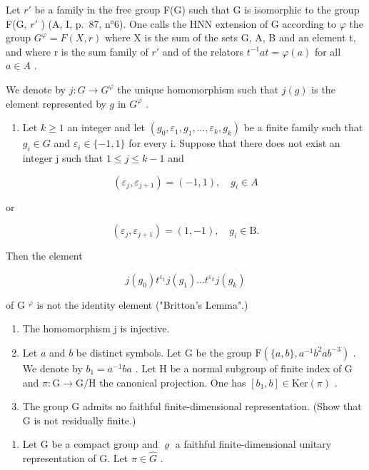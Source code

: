 Let \(r'\) be a family in the free group F(G) such that G is isomorphic to the group F(G, \(r'\) ) (A, I, p.~87, n°6). One calls the HNN extension of G according to \(\varphi\) the group \(G^{\varphi} = F(X, r)\) where X is the sum of the sets G, A, B and an element t, and where r is the sum family of \(r'\) and of the relators \(t^{-1}at = \varphi(a)\) for all \(a \in A\) .

We denote by \(j\colon G\to G^{\varphi}\) the unique homomorphism such that \(j(g)\) is the element represented by \(g\) in \(G^{\varphi}\) .

\begin{enumerate}
\def\labelenumi{\alph{enumi})}
\tightlist
\item
  Let \(k \geqslant 1\) an integer and let \((g_{0}, \varepsilon_{1}, g_{1}, \ldots, \varepsilon_{k}, g_{k})\) be a finite family such that \(g_{i} \in G\) and \(\varepsilon_{i} \in \{-1, 1\}\) for every i. Suppose that there does not exist an integer j such that \(1 \leqslant j \leqslant k - 1\) and
\end{enumerate}

\[
(\varepsilon_ {j}, \varepsilon_ {j + 1}) = (- 1, 1), \quad g _ {i} \in A
\]

or

\[
(\varepsilon_ {j}, \varepsilon_ {j + 1}) = (1, - 1), \quad g _ {i} \in \mathrm{B}.
\]

Then the element

\[
j (g _ {0}) t ^ {\varepsilon_ {1}} j (g _ {1}) \dots t ^ {\varepsilon_ {k}} j (g _ {k})
\]

of G \(^{φ}\) is not the identity element ("Britton's Lemma".)

\begin{enumerate}
\def\labelenumi{\alph{enumi})}
\setcounter{enumi}{1}
\item
  The homomorphism j is injective.
\item
  Let \(a\) and \(b\) be distinct symbols. Let G be the group \(\mathrm{F}(\{a,b\}, a^{-1}b^{2}ab^{-3})\) . We denote by \(b_{1} = a^{-1}ba\) . Let H be a normal subgroup of finite index of G and \(\pi: \mathrm{G} \to \mathrm{G}/\mathrm{H}\) the canonical projection. One has \([b_{1}, b] \in \mathrm{Ker}(\pi)\) .
\item
  The group G admits no faithful finite-dimensional representation. (Show that G is not residually finite.)
\end{enumerate}

\begin{enumerate}
\def\labelenumi{\arabic{enumi})}
\setcounter{enumi}{4}
\tightlist
\item
  Let G be a compact group and \(\varrho\) a faithful finite-dimensional unitary representation of G. Let \(\pi \in \widehat{G}\) .
\end{enumerate}

